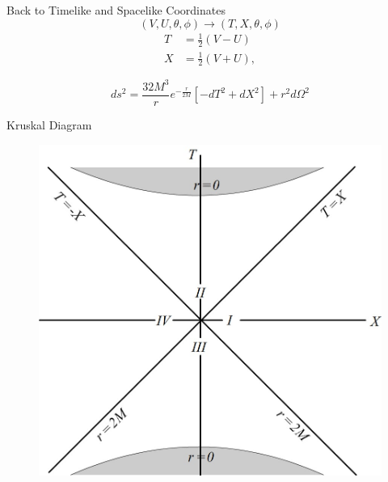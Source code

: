 \documentclass{beamer}
\begin{document}
        \begin{frame}{Back to Timelike and Spacelike Coordinates}
            $$ (V, U, \theta, \phi) \longrightarrow (T, X, \theta, \phi) $$
            \pause
            	\begin{align*}
					T & = \frac{1}{2}\left(V-U\right)\\
					X & = \frac{1}{2}\left(V+U\right),
				\end{align*}
            \pause
            \bigskip
            
            $$ ds^2 = \frac{32M^{3}}{r}e^{-\frac{r}{2M}}\left[ -dT^2 + dX^2 \right] + r^2 d\Omega^{2} $$
        \end{frame}
        
        \begin{frame}{Kruskal Diagram}
        	\begin{center}
				\begin{figure}
				\includegraphics[scale=0.75] {fig6.jpg}
				\end{figure}
			\end{center}	
        \end{frame}
        
\end{document}
